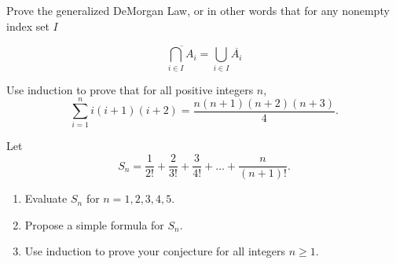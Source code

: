 \documentclass[12pt]{article}
\begin{document}
\begin{qu}
Prove the generalized DeMorgan Law, or in other words that for any nonempty index set $I$

$$\overline{\bigcap_{i \in I} A_i} = \bigcup_{i\in I} \overline{A_i}$$
\end{qu}


\begin{qu}
Use induction to prove that for all positive integers $n$,
$$ \sum_{i=1}^n i(i+1)(i+2) = \frac{n(n+1)(n+2)(n+3)}{4}.$$
\end{qu}

\begin{qu}
Let $$S_n = \frac{1}{2!} + \frac{2}{3!} + \frac{3}{4!} + \dots + \frac{n}{(n+1)!}.$$

\begin{enumerate}[label=\alph*)]
\item Evaluate $S_n$ for $n = 1, 2, 3, 4, 5$.
\item Propose a simple formula for $S_n$.
\item Use induction to prove your conjecture for all integers $n \geq 1$.
\end{enumerate}
\end{qu}
\end{document}
